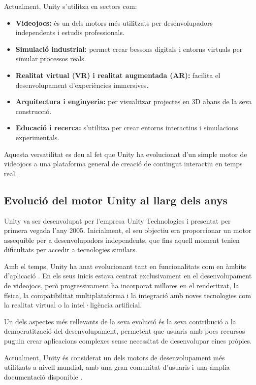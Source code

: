 \documentclass[12pt,a4paper]{report}
\begin{document}
Actualment, Unity s'utilitza en sectors com:

\begin{itemize}
\item \textbf{Videojocs:} és un dels motors més utilitzats per desenvolupadors independents i estudis professionals.
\item \textbf{Simulació industrial:} permet crear bessons digitals i entorns virtuals per simular processos reals.
\item \textbf{Realitat virtual (VR) i realitat augmentada (AR):} facilita el desenvolupament d'experiències immersives.
\item \textbf{Arquitectura i enginyeria:} per visualitzar projectes en 3D abans de la seva construcció.
\item \textbf{Educació i recerca:} s'utilitza per crear entorns interactius i simulacions experimentals.
\end{itemize}

Aquesta versatilitat es deu al fet que Unity ha evolucionat d'un simple motor de videojocs a una plataforma general de creació de contingut interactiu en temps real.



\subsection{Evolució del motor Unity al llarg dels anys}

Unity va ser desenvolupat per l'empresa Unity Technologies i presentat per primera vegada l'any 2005. Inicialment, el seu objectiu era proporcionar un motor assequible per a desenvolupadors independents, que fins aquell moment tenien dificultats per accedir a tecnologies similars.

Amb el temps, Unity ha anat evolucionant tant en funcionalitats com en àmbits d'aplicació \cite{UnityLearnIntro}. En els seus inicis estava centrat exclusivament en el desenvolupament de videojocs, però progressivament ha incorporat millores en el renderitzat, la física, la compatibilitat multiplataforma i la integració amb noves tecnologies com la realitat virtual o la intel·ligència artificial.

Un dels aspectes més rellevants de la seva evolució és la seva contribució a la democratització del desenvolupament, permetent que usuaris amb pocs recursos puguin crear aplicacions complexes sense necessitat de desenvolupar eines pròpies.

Actualment, Unity és considerat un dels motors de desenvolupament més utilitzats a nivell mundial, amb una gran comunitat d'usuaris i una àmplia documentació disponible \cite{UnityWikipedia}.
\end{document}
